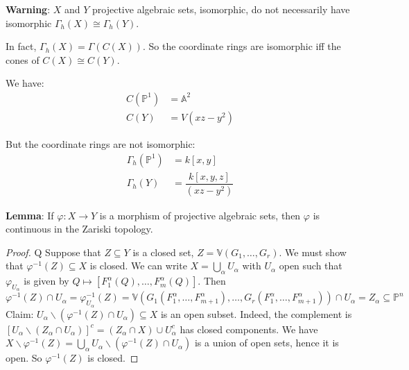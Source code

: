 \documentclass{report}
\begin{document}
\textbf{Warning}: $X$ and $Y$ projective algebraic sets, isomorphic, do not necessarily have isomorphic $\Gamma_{h}(X) \cong \Gamma_{h}(Y)$.

In fact, $\Gamma_{h}(X) = \Gamma (C(X))$. So the coordinate rings are isomorphic iff the cones of $C(X) \cong C(Y)$.

We have:
    \begin{align*}
        C(\mathbb{P}^{1}) &= \mathbb{A}^{2} \\
        C(Y)              &= V(xz - y^{2})    
    \end{align*}

But the coordinate rings are not isomorphic:
    \begin{align*}
        \Gamma_{h}(\mathbb{P}^{1}) &= k[x, y]                          \\
        \Gamma_{h}(Y)              &= \dfrac{k[x, y, z]}{(xz - y^{2})}   
    \end{align*}

\textbf{Lemma}: If $\varphi : X \rightarrow Y$ is a morphism of projective algebraic sets, then $\varphi$ is continuous in the Zariski topology.
    \begin{proof}Q
        Suppose that $Z \subseteq Y$ is a closed set, $Z = \mathbb{V}(G_{1}, \ldots, G_{r})$. We must show that $\varphi^{-1}(Z) \subseteq X$ is closed. We can write $X =  \bigcup_{\alpha} U_{\alpha}$ with $U_{\alpha}$ open such that $\varphi_{U_{\alpha}}$ is given by $Q \mapsto [F_{1}^{\alpha} (Q), \ldots, F_{m}^{\alpha} (Q) ]$. Then 
            \begin{equation*}
                \varphi^{-1}(Z) \cap U_{\alpha} = \varphi^{-1}_{U_{\alpha}} (Z) = \mathbb{V}(G_{1}(F_{1}^{\alpha}, \ldots, F^{\alpha}_{m + 1}), \ldots, G_{r}(F^{\alpha}_{1}, \ldots, F_{m + 1}^{\alpha})) \cap U_{\alpha} = Z_{\alpha} \subseteq \mathbb{P}^{n}
            \end{equation*}
        Claim: $U_{\alpha} \backslash (\varphi^{-1}(Z) \cap U_{\alpha}) \subseteq X$ is an open subset. Indeed, the complement is $[U_{\alpha} \backslash (Z_{\alpha} \cap U_{\alpha})]^{c} = (Z_{\alpha} \cap X) \cup U_{\alpha}^{c}$ has closed components. We have $X \backslash \varphi^{-1}(Z) = \bigcup_{\alpha} U_{\alpha}\backslash (\varphi^{-1}(Z) \cap U_{\alpha})$ is a union of open sets, hence it is open. So $\varphi^{-1}(Z)$ is closed.
    \end{proof}
\end{document}
